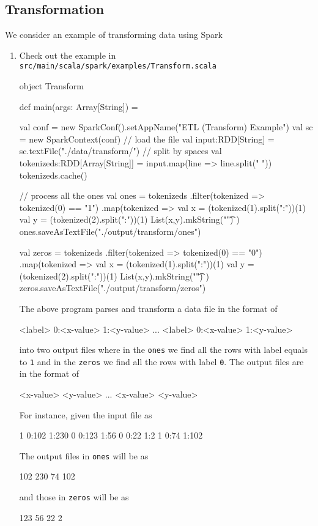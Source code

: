\documentclass[10pt]{article}
\begin{document}
\subsection{Transformation} 
We consider an example of transforming data using Spark

\begin{enumerate}
\item Check out the example in {\tt src/main/scala/spark/examples/Transform.scala}
\begin{code}
  object Transform {
    def main(args: Array[String]) = {
      val conf = new SparkConf().setAppName("ETL (Transform) Example")
      val sc   = new SparkContext(conf)
      // load the file
      val input:RDD[String] = sc.textFile("./data/transform/")
      // split by spaces
      val tokenizeds:RDD[Array[String]] = input.map(line => line.split(" "))
      tokenizeds.cache()
      
      // process all the ones
      val ones = tokenizeds
      .filter(tokenized => tokenized(0) == "1")
      .map(tokenized => { 
        val x = (tokenized(1).split(":"))(1)
        val y = (tokenized(2).split(":"))(1)
        List(x,y).mkString("\t")
      })
      ones.saveAsTextFile("./output/transform/ones")

      val zeros = tokenizeds
      .filter(tokenized => tokenized(0) == "0")
      .map(tokenized => { 
        val x = (tokenized(1).split(":"))(1)
        val y = (tokenized(2).split(":"))(1)
        List(x,y).mkString("\t")
      })
      zeros.saveAsTextFile("./output/transform/zeros")
    }
  }
\end{code}
The above program parses and transform a data file in the format of 
\begin{code}
<label> 0:<x-value> 1:<y-value> 
...
<label> 0:<x-value> 1:<y-value> 
\end{code} 
into two output files where in the {\tt ones} we find all the rows with label equals to {\tt 1}  and in the {\tt zeros} we find all the rows with label {\tt 0}.
The output files are in the format of 
\begin{code}
<x-value>    <y-value>
...
<x-value>    <y-value>
\end{code}
For instance, given the input file as 
\begin{code}
1 0:102 1:230
0 0:123 1:56
0 0:22  1:2
1 0:74 1:102
\end{code}

The output files in {\tt ones} will be as 
\begin{code}
102    230
74     102
\end{code}
and those in {\tt zeros} will be as
\begin{code}
123    56
22     2
\end{code}


\end{enumerate}
\end{document}
